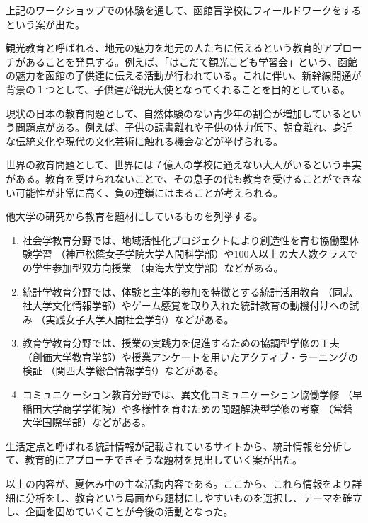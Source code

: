 \documentclass[openany,11pt,papersize]{jsbook}
\begin{document}
\par 上記のワークショップでの体験を通して、函館盲学校にフィールドワークをするという案が出た。
\par 観光教育と呼ばれる、地元の魅力を地元の人たちに伝えるという教育的アプローチがあることを発見する。例えば、「はこだて観光こども学習会」という、函館の魅力を函館の子供達に伝える活動が行われている。これに伴い、新幹線開通が背景の１つとして、子供達が観光大使となってくれることを目的としている。
\par 現状の日本の教育問題として、自然体験のない青少年の割合が増加しているという問題点がある。例えば、子供の読書離れや子供の体力低下、朝食離れ、身近な伝統文化や現代の文化芸術に触れる機会などが挙げられる。
\par 世界の教育問題として、世界には７億人の学校に通えない大人がいるという事実がある。教育を受けられないことで、その息子の代も教育を受けることができない可能性が非常に高く、負の連鎖にはまることが考えられる。
\par 他大学の研究から教育を題材にしているものを列挙する。
\begin{enumerate}
\item 社会学教育分野では、地域活性化プロジェクトにより創造性を育む協働型体験学習 （神戸松蔭女子学院大学人間科学部）や100人以上の大人数クラスでの学生参加型双方向授業 （東海大学文学部）などがある。
\item 統計学教育分野では、体験と主体的参加を特徴とする統計活用教育 （同志社大学文化情報学部）やゲーム感覚を取り入れた統計教育の動機付けへの試み （実践女子大学人間社会学部）などがある。
\item 教育学教育分野では、授業の実践力を促進するための協調型学修の工夫 （創価大学教育学部）や授業アンケートを用いたアクティブ・ラーニングの検証 （関西大学総合情報学部）などがある。
\item コミュニケーション教育分野では、異文化コミュニケーション協働学修 （早稲田大学商学学術院）や多様性を育むための問題解決型学修の考察 （常磐大学国際学部）などがある。
\end{enumerate}
\par 生活定点と呼ばれる統計情報が記載されているサイトから、統計情報を分析して、教育的にアプローチできそうな題材を見出していく案が出た。
\par 以上の内容が、夏休み中の主な活動内容である。ここから、これら情報をより詳細に分析をし、教育という局面から題材にしやすいものを選択し、テーマを確立し、企画を固めていくことが今後の活動となった。
\end{document}
